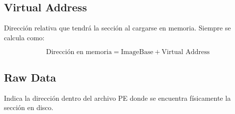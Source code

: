 \subsection{Virtual Address}
Dirección relativa que tendrá la sección al cargarse en memoria.  
Siempre se calcula como:

\begin{equation}
\text{Dirección en memoria} = \text{ImageBase} + \text{Virtual Address}
\end{equation}

\subsection{Raw Data}
Indica la dirección dentro del archivo PE donde se encuentra físicamente la sección en disco.
